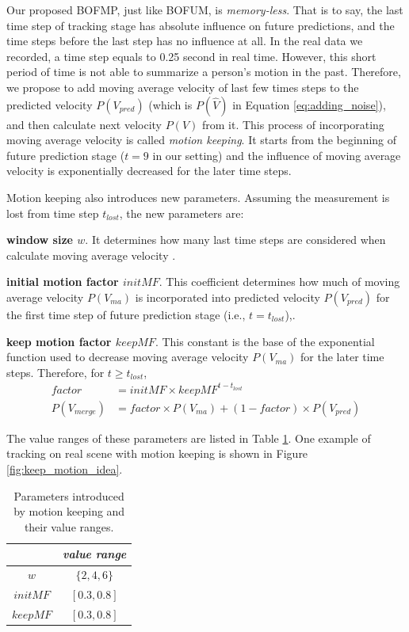 Our proposed BOFMP, just like BOFUM, is \textit{memory-less}. That is to say, the last time step of tracking stage has absolute influence on future predictions, and the time steps before the last step has no influence at all. In the real data we recorded, a time step equals to 0.25 second in real time. However, this short period of time is not able to summarize a person's motion in the past. Therefore, we propose to add moving average velocity of last few times steps to the predicted velocity $P(V_{pred})$ (which is $P(\hat{V})$ in Equation \ref{eq:adding_noise}), and then calculate next velocity $P(V)$ from it. This process of incorporating moving average velocity is called \textit{motion keeping}. It starts from the beginning of future prediction stage ($t=9$ in our setting) and the influence of moving average velocity is exponentially decreased for the later time steps.

Motion keeping also introduces new parameters. Assuming the measurement is lost from time step $t_{lost}$, the new parameters are: 
\begin{my_enumerate}
\item \textbf{window size $w$}. It determines how many last time steps are considered when calculate moving average velocity .
\item \textbf{initial motion factor \( initMF\)}. This coefficient determines how much of moving average velocity $P(V_{ma})$ is incorporated into predicted velocity $P(V_{pred})$ for the first time step of future prediction stage (i.e., $t=t_{lost}$),. 
\item \textbf{keep motion factor \( keepMF \)}. This constant is the base of the exponential function used to decrease moving average velocity $P(V_{ma})$ for the later time steps. Therefore, for $t \geq t_{lost}$, 
\begin{align}
factor &= initMF \times keepMF^{t-t_{lost}} \\
P(V_{merge}) &= factor \times P(V_{ma}) + (1-factor) \times P(V_{pred})
\end{align}

\end{my_enumerate}

The value ranges of these parameters are listed in Table \ref{table:motion_keeping_param_range}. One example of tracking on real scene with motion keeping is shown in Figure \ref{fig:keep_motion_idea}.
\begin{table}[H]
\centering  
\begin{tabularx}{.3\textwidth}{c|c}
    \hline
      &  \textit{value range } \\ \hline
    $w$ & \( \{2, 4, 6\} \)  \\
     $initMF$ & \( [0.3, 0.8]\) \\  
     $keepMF$ & \( [0.3, 0.8]\) \\    
   \hline
  \end{tabularx}
\caption{Parameters introduced by motion keeping and their value ranges.}
\label{table:motion_keeping_param_range}
\end{table}

